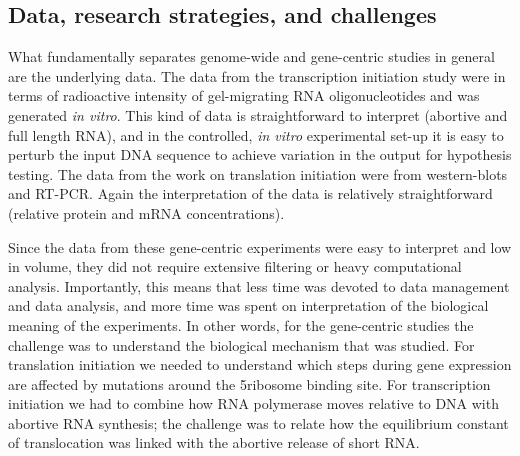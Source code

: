 \subsection{Data, research strategies, and challenges}
What fundamentally separates genome-wide and gene-centric studies in general
are the underlying data. The data from the transcription initiation study were
in terms of radioactive intensity of gel-migrating RNA oligonucleotides and was
generated \textit{in vitro}. This kind of data is straightforward to interpret
(abortive and full length RNA), and in the controlled, \textit{in vitro}
experimental set-up it is easy to perturb the input DNA sequence to achieve
variation in the output for hypothesis testing. The data from the work on
translation initiation were from western-blots and RT-PCR. Again the
interpretation of the data is relatively straightforward (relative protein and
mRNA concentrations).

Since the data from these gene-centric experiments were easy to interpret and
low in volume, they did not require extensive filtering or heavy computational
analysis. Importantly, this means that less time was devoted to data management
and data analysis, and more time was spent on interpretation of the biological
meaning of the experiments. In other words, for the gene-centric studies the
challenge was to understand the biological mechanism that was studied. For
translation initiation we needed to understand which steps during gene
expression are affected by mutations around the 5\ppp ribosome binding site.
For transcription initiation we had to combine how RNA polymerase moves
relative to DNA with abortive RNA synthesis; the challenge was to relate how
the equilibrium constant of translocation was linked with the abortive release
of short RNA.

